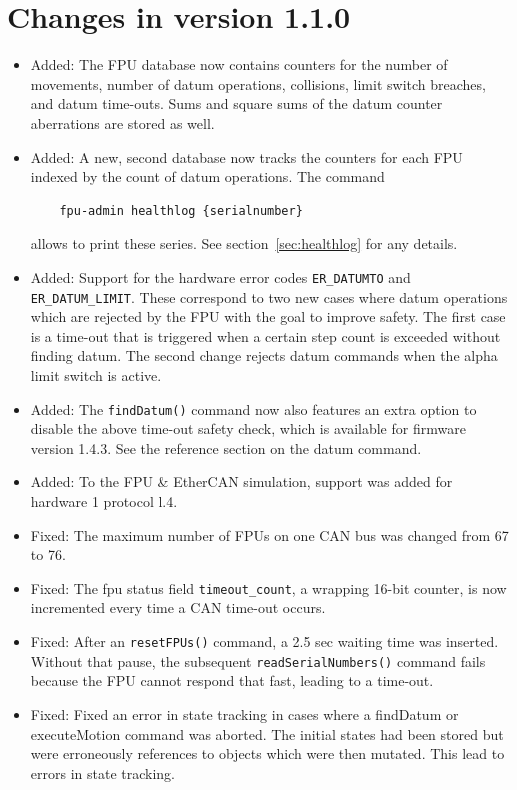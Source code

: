 \documentclass[fontsize=12,a4paper]{scrreprt}
\begin{document}
\section*{Changes in version 1.1.0}
\begin{itemize}
\item Added: The FPU database now contains counters for the number of
  movements, number of datum operations, collisions, limit switch
  breaches, and datum time-outs. Sums and square sums of the datum
  counter aberrations are stored as well.

\item Added: A new, second database now tracks the counters for each
  FPU indexed by the count of datum operations. The command
  \begin{verbatim}
    fpu-admin healthlog {serialnumber}
  \end{verbatim}
  allows to print these series. See section~\ref{sec:healthlog} for
  any details.

\item Added: Support for the hardware error codes \texttt{ER\_DATUMTO}
  and \texttt{ER\_DATUM\_LIMIT}. These correspond to two new cases
  where datum operations which are rejected by the FPU with the goal
  to improve safety. The first case is a time-out that is triggered
  when a certain step count is exceeded without finding datum.  The
  second change rejects datum commands when the alpha limit switch is
  active.

\item Added: The \texttt{findDatum()} command now also features an
  extra option to disable the above time-out safety check, which is
  available for firmware version 1.4.3. See the reference section on
  the datum command.

\item Added: To the FPU \& EtherCAN simulation, support
  was added for hardware 1 protocol l.4.

\item Fixed: The maximum number of FPUs on one CAN bus was changed
  from 67 to 76.

\item Fixed: The fpu status field \texttt{timeout\_count}, a wrapping
  16-bit counter, is now incremented every time a CAN time-out occurs.

\item Fixed: After an \texttt{resetFPUs()} command, a 2.5 sec waiting
  time was inserted. Without that pause, the subsequent
  \texttt{readSerialNumbers()} command fails because the FPU cannot
  respond that fast, leading to a time-out.

\item Fixed: Fixed an error in state tracking in cases where
  a findDatum or executeMotion command was aborted. The
  initial states had been stored but were erroneously
  references to objects which were then mutated. This lead
  to errors in state tracking.

\end{itemize}
\end{document}
